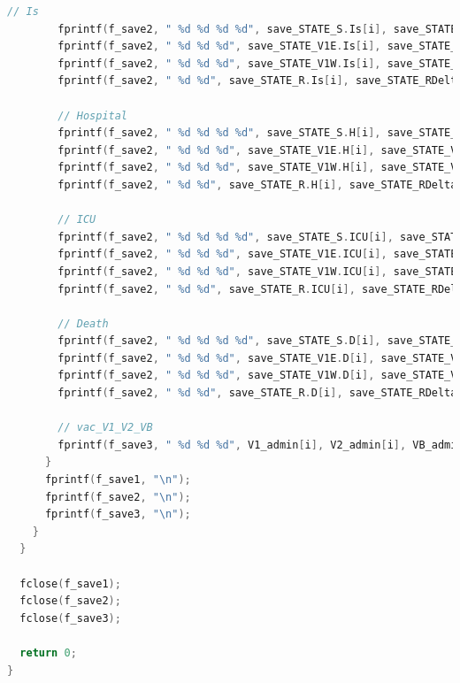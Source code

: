 \documentclass[bwprint]{gmcmthesis}
\numberwithin{figure}{section}
\begin{document}
\begin{lstlisting}[language=C]
        // Is
        fprintf(f_save2, " %d %d %d %d", save_STATE_S.Is[i], save_STATE_V1.Is[i], save_STATE_V2.Is[i], save_STATE_V3.Is[i]);
        fprintf(f_save2, " %d %d %d", save_STATE_V1E.Is[i], save_STATE_V2E.Is[i], save_STATE_V3E.Is[i]);
        fprintf(f_save2, " %d %d %d", save_STATE_V1W.Is[i], save_STATE_V2W.Is[i], save_STATE_V3W.Is[i]);
        fprintf(f_save2, " %d %d", save_STATE_R.Is[i], save_STATE_RDelta.Is[i]);

        // Hospital
        fprintf(f_save2, " %d %d %d %d", save_STATE_S.H[i], save_STATE_V1.H[i], save_STATE_V2.H[i], save_STATE_V3.H[i]);
        fprintf(f_save2, " %d %d %d", save_STATE_V1E.H[i], save_STATE_V2E.H[i], save_STATE_V3E.H[i]);
        fprintf(f_save2, " %d %d %d", save_STATE_V1W.H[i], save_STATE_V2W.H[i], save_STATE_V3W.H[i]);
        fprintf(f_save2, " %d %d", save_STATE_R.H[i], save_STATE_RDelta.H[i]);

        // ICU
        fprintf(f_save2, " %d %d %d %d", save_STATE_S.ICU[i], save_STATE_V1.ICU[i], save_STATE_V2.ICU[i], save_STATE_V3.ICU[i]);
        fprintf(f_save2, " %d %d %d", save_STATE_V1E.ICU[i], save_STATE_V2E.ICU[i], save_STATE_V3E.ICU[i]);
        fprintf(f_save2, " %d %d %d", save_STATE_V1W.ICU[i], save_STATE_V2W.ICU[i], save_STATE_V3W.ICU[i]);
        fprintf(f_save2, " %d %d", save_STATE_R.ICU[i], save_STATE_RDelta.ICU[i]);

        // Death
        fprintf(f_save2, " %d %d %d %d", save_STATE_S.D[i], save_STATE_V1.D[i], save_STATE_V2.D[i], save_STATE_V3.D[i]);
        fprintf(f_save2, " %d %d %d", save_STATE_V1E.D[i], save_STATE_V2E.D[i], save_STATE_V3E.D[i]);
        fprintf(f_save2, " %d %d %d", save_STATE_V1W.D[i], save_STATE_V2W.D[i], save_STATE_V3W.D[i]);
        fprintf(f_save2, " %d %d", save_STATE_R.D[i], save_STATE_RDelta.D[i]);

        // vac_V1_V2_VB
        fprintf(f_save3, " %d %d %d", V1_admin[i], V2_admin[i], VB_admin[i]);
      }
      fprintf(f_save1, "\n");
      fprintf(f_save2, "\n");
      fprintf(f_save3, "\n");
    }
  }

  fclose(f_save1);
  fclose(f_save2);
  fclose(f_save3);

  return 0;
}


 \end{lstlisting}
\end{document}
